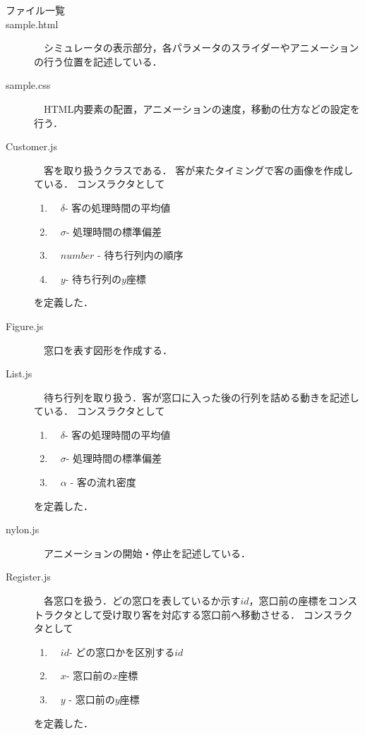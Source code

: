 \documentclass[12pt,a4j]{ltjsarticle}
\begin{document}
\begin{description}
  \item[ファイル一覧]
  
  \item[sample.html]　シミュレータの表示部分，各パラメータのスライダーやアニメーションの行う位置を記述している．
  \vspace{10mm}
  
  \item[sample.css]　HTML内要素の配置，アニメーションの速度，移動の仕方などの設定を行う．
  \vspace{10mm}
  
  \item[Customer.js]　客を取り扱うクラスである．
  客が来たタイミングで客の画像を作成している．
  コンスラクタとして
  \begin{enumerate}[label=(\arabic*)]
	\item　$\delta$- 客の処理時間の平均値
	\item　$\sigma$- 処理時間の標準偏差
	\item　$number$  - 待ち行列内の順序
	\item　$y$- 待ち行列の$y$座標
\end{enumerate}
を定義した．
\vspace{10mm}

  \item[Figure.js] 　窓口を表す図形を作成する．
  \vspace{10mm}
  
  \item[List.js]　待ち行列を取り扱う．客が窓口に入った後の行列を詰める動きを記述している． コンスラクタとして
  \begin{enumerate}[label=(\roman*)]
	\item　$\delta$- 客の処理時間の平均値
	\item　$\sigma$- 処理時間の標準偏差
	\item　$\alpha$ - 客の流れ密度
\end{enumerate}
を定義した．
\vspace{10mm}

  \item[nylon.js]　アニメーションの開始・停止を記述している．
  \vspace{10mm}
  
  \item[Register.js]　各窓口を扱う．どの窓口を表しているか示す$id$，窓口前の座標をコンストラクタとして受け取り客を対応する窓口前へ移動させる．
 コンスラクタとして
  \begin{enumerate}[label=(\Roman*)]
	\item　$id$- どの窓口かを区別する$id$
	\item　$x$- 窓口前の$x$座標
	\item　$y$ - 窓口前の$y$座標
\end{enumerate}
を定義した．
\vspace{10mm}
\clearpage


\end{description}
\end{document}
